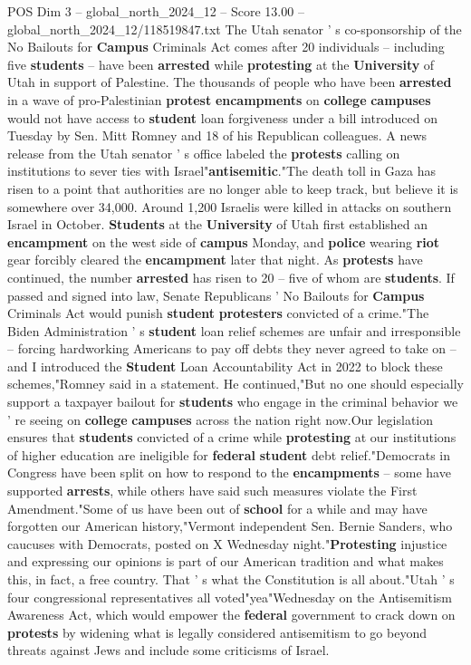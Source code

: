 \begin{textsample}{POS Dim 3 – global\_north\_2024\_12 – Score 13.00 – global\_north\_2024\_12/118519847.txt}  \label{ex:f3_pos_218}
The Utah senator ' s co-sponsorship of the No Bailouts for \textbf{Campus} Criminals Act comes after 20 individuals -- including five \textbf{students} -- have been \textbf{arrested} while \textbf{protesting} at the \textbf{University} of Utah in support of Palestine.
The thousands of people who have been \textbf{arrested} in a wave of pro-Palestinian \textbf{protest} \textbf{encampments} on \textbf{college} \textbf{campuses} would not have access to \textbf{student} loan forgiveness under a bill introduced on Tuesday by Sen.
Mitt Romney and 18 of his Republican colleagues.
A news release from the Utah senator ' s office labeled the \textbf{protests} calling on institutions to sever ties with Israel"\textbf{antisemitic}."The death toll in Gaza has risen to a point that authorities are no longer able to keep track, but believe it is somewhere over 34,000.
Around 1,200 Israelis were killed in attacks on southern Israel in October. \textbf{Students} at the \textbf{University} of Utah first established an \textbf{encampment} on the west side of \textbf{campus} Monday, and \textbf{police} wearing \textbf{riot} gear forcibly cleared the \textbf{encampment} later that night.
As \textbf{protests} have continued, the number \textbf{arrested} has risen to 20 -- five of whom are \textbf{students}.
If passed and signed into law, Senate Republicans ' No Bailouts for \textbf{Campus} Criminals Act would punish \textbf{student} \textbf{protesters} convicted of a crime."The Biden Administration ' s \textbf{student} loan relief schemes are unfair and irresponsible -- forcing hardworking Americans to pay off debts they never agreed to take on -- and I introduced the \textbf{Student} Loan Accountability Act in 2022 to block these schemes,"Romney said in a statement.
He continued,"But no one should especially support a taxpayer bailout for \textbf{students} who engage in the criminal behavior we ' re seeing on \textbf{college} \textbf{campuses} across the nation right now.Our legislation ensures that \textbf{students} convicted of a crime while \textbf{protesting} at our institutions of higher education are ineligible for \textbf{federal} \textbf{student} debt relief."Democrats in Congress have been split on how to respond to the \textbf{encampments} -- some have supported \textbf{arrests}, while others have said such measures violate the First Amendment."Some of us have been out of \textbf{school} for a while and may have forgotten our American history,"Vermont independent Sen.
Bernie Sanders, who caucuses with Democrats, posted on X Wednesday night."\textbf{Protesting} injustice and expressing our opinions is part of our American tradition and what makes this, in fact, a free country.
That ' s what the Constitution is all about."Utah ' s four congressional representatives all voted"yea"Wednesday on the Antisemitism Awareness Act, which would empower the \textbf{federal} government to crack down on \textbf{protests} by widening what is legally considered antisemitism to go beyond threats against Jews and include some criticisms of Israel.

\end{textsample}
